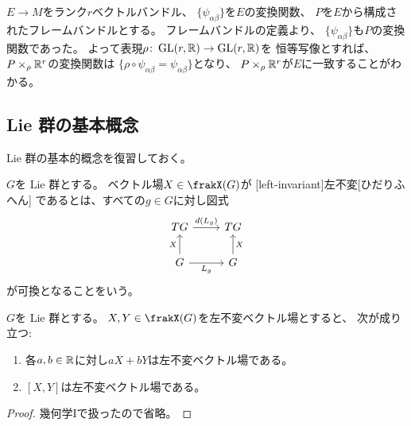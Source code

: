 \documentclass[report]{jlreq}
\begin{document}
\begin{example}[ベクトルバンドルのフレームバンドルに同伴するベクトルバンドル]
    $E \to M$をランク$r$ベクトルバンドル、
    $\{ \psi_{\alpha\beta} \}$を$E$の変換関数、
    $P$を$E$から構成されたフレームバンドルとする。
    フレームバンドルの定義より、
    $\{ \psi_{\alpha\beta} \}$も$P$の変換関数であった。
    よって表現$\rho \colon \operatorname{\mathrm{GL}}(r, \mathbb{R}) \to \operatorname{\mathrm{GL}}(r, \mathbb{R})$を
    恒等写像とすれば、
    $P \times_\rho \mathbb{R}^r$の変換関数は
    $\{ \rho \circ \psi_{\alpha\beta} = \psi_{\alpha\beta} \}$となり、
    $P \times_\rho \mathbb{R}^r$が$E$に一致することがわかる。
\end{example}

%
\subsection{Lie 群の基本概念}

Lie 群の基本的概念を復習しておく。

\begin{definition}[左不変ベクトル場]
    $G$を Lie 群とする。
    ベクトル場$X \in \frakX(G)$が
    [left-invariant]{左不変}[ひだりふへん]
    であるとは、すべての$g \in G$に対し図式
    \begin{equation}
        \begin{tikzcd}
            TG \ar{r}{d(L_g)} & TG \\
            G \ar{u}{X} \ar{r}[swap]{L_g} & G \ar{u}[swap]{X}
        \end{tikzcd}
    \end{equation}
    が可換となることをいう。
\end{definition}

\begin{lemma}
    $G$を Lie 群とする。
    $X, Y \in \frakX(G)$を左不変ベクトル場とすると、
    次が成り立つ:
    \begin{enumerate}
        \item 各$a, b \in \mathbb{R}$に対し$aX + bY$は左不変ベクトル場である。
        \item $[X, Y]$は左不変ベクトル場である。
    \end{enumerate}
\end{lemma}

\begin{proof}
    幾何学Iで扱ったので省略。
\end{proof}
\end{document}
